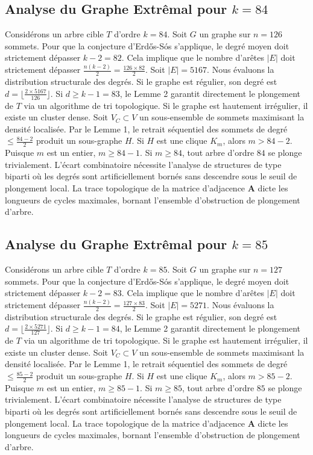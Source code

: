 \documentclass[11pt,a4paper]{article}
\begin{document}
\subsection{Analyse du Graphe Extr\^emal pour $k=84$}
Consid\'erons un arbre cible $T$ d'ordre $k=84$.
Soit $G$ un graphe sur $n=126$ sommets.
Pour que la conjecture d'Erd\H{o}s-S\'os s'applique, le degr\'e moyen doit strictement d\'epasser $k-2 = 82$.
Cela implique que le nombre d'ar\^etes $|E|$ doit strictement d\'epasser $\frac{n(k-2)}{2} = \frac{126 \times 82}{2}$.
Soit $|E| = 5167$.
Nous \'evaluons la distribution structurale des degr\'es. Si le graphe est r\'egulier, son degr\'e est $d = \lfloor \frac{2 \times 5167}{126} \rfloor$.
Si $d \geq k-1 = 83$, le Lemme 2 garantit directement le plongement de $T$ via un algorithme de tri topologique.
Si le graphe est hautement irr\'egulier, il existe un cluster dense. Soit $V_C \subset V$ un sous-ensemble de sommets maximisant la densit\'e localis\'ee.
Par le Lemme 1, le retrait s\'equentiel des sommets de degr\'e $\leq \frac{84-2}{2}$ produit un sous-graphe $H$.
Si $H$ est une clique $K_{m}$, alors $m > 84-2$. Puisque $m$ est un entier, $m \geq 84-1$. Si $m \geq 84$, tout arbre d'ordre $84$ se plonge trivialement.
L'\'ecart combinatoire n\'ecessite l'analyse de structures de type biparti o\`u les degr\'es sont artificiellement born\'es sans descendre sous le seuil de plongement local. La trace topologique de la matrice d'adjacence $\mathbf{A}$ dicte les longueurs de cycles maximales, bornant l'ensemble d'obstruction de plongement d'arbre.


\subsection{Analyse du Graphe Extr\^emal pour $k=85$}
Consid\'erons un arbre cible $T$ d'ordre $k=85$.
Soit $G$ un graphe sur $n=127$ sommets.
Pour que la conjecture d'Erd\H{o}s-S\'os s'applique, le degr\'e moyen doit strictement d\'epasser $k-2 = 83$.
Cela implique que le nombre d'ar\^etes $|E|$ doit strictement d\'epasser $\frac{n(k-2)}{2} = \frac{127 \times 83}{2}$.
Soit $|E| = 5271$.
Nous \'evaluons la distribution structurale des degr\'es. Si le graphe est r\'egulier, son degr\'e est $d = \lfloor \frac{2 \times 5271}{127} \rfloor$.
Si $d \geq k-1 = 84$, le Lemme 2 garantit directement le plongement de $T$ via un algorithme de tri topologique.
Si le graphe est hautement irr\'egulier, il existe un cluster dense. Soit $V_C \subset V$ un sous-ensemble de sommets maximisant la densit\'e localis\'ee.
Par le Lemme 1, le retrait s\'equentiel des sommets de degr\'e $\leq \frac{85-2}{2}$ produit un sous-graphe $H$.
Si $H$ est une clique $K_{m}$, alors $m > 85-2$. Puisque $m$ est un entier, $m \geq 85-1$. Si $m \geq 85$, tout arbre d'ordre $85$ se plonge trivialement.
L'\'ecart combinatoire n\'ecessite l'analyse de structures de type biparti o\`u les degr\'es sont artificiellement born\'es sans descendre sous le seuil de plongement local. La trace topologique de la matrice d'adjacence $\mathbf{A}$ dicte les longueurs de cycles maximales, bornant l'ensemble d'obstruction de plongement d'arbre.
\end{document}
